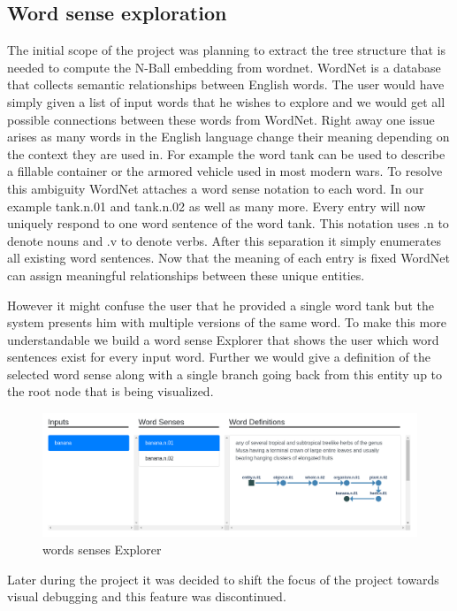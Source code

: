 \documentclass[]{article}
\begin{document}
\subsection{Word sense exploration}
The initial scope of the project was planning to extract the tree structure that is needed to compute the N-Ball embedding from wordnet. WordNet is a database that collects semantic relationships between English words. The user would have simply given a list of input words that he wishes to explore and we would get all possible connections between these words from WordNet. 
Right away one issue arises as many words in the English language change their meaning depending on the context they are used in. For example the word tank can be used to describe a fillable container or the armored vehicle used in most modern wars. To resolve this ambiguity WordNet attaches a word sense notation to each word. In our example tank.n.01 and tank.n.02 as well as many more. Every entry will now uniquely respond to one word sentence of the word tank. This notation uses .n to denote nouns and .v to denote verbs. After this separation it simply enumerates all existing word sentences. Now that the meaning of each entry is fixed WordNet can assign meaningful relationships between these unique entities. 

However it might confuse the user that he provided a single word tank but the system presents him with multiple versions of the same word. To make this more understandable we build a word sense Explorer that shows the user which word sentences exist for every input word. Further we would give a definition of the selected word sense along with a single branch going back from this entity up to the root node that is being visualized.

\begin{figure}[H]
	\includegraphics[width=\textwidth]{res/word-sense.png}
	\caption{words senses Explorer}
	\label{fig:word-sense}
\end{figure}



Later during the project it was decided to shift the focus of the project towards visual debugging and this feature was discontinued.
\end{document}
